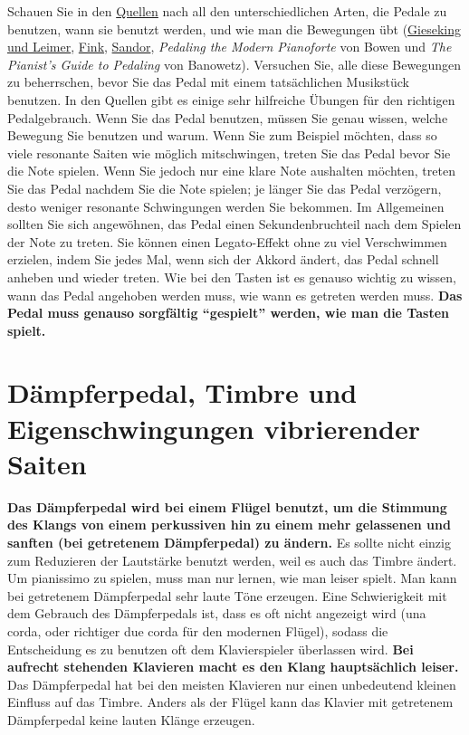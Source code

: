 Schauen Sie in den \hyperlink{reference}{Quellen} nach all den unterschiedlichen Arten, die Pedale zu benutzen, wann sie benutzt werden, und wie man die Bewegungen übt (\hyperlink{Gieseking}{Gieseking und Leimer}, \hyperlink{Fink}{Fink}, \hyperlink{Sandor}{Sandor}, \textit{Pedaling the Modern Pianoforte} von Bowen und \textit{The Pianist's Guide to Pedaling} von Banowetz).
Versuchen Sie, alle diese Bewegungen zu beherrschen, bevor Sie das Pedal mit einem tatsächlichen Musikstück benutzen.
In den Quellen gibt es einige sehr hilfreiche Übungen für den richtigen Pedalgebrauch.
Wenn Sie das Pedal benutzen, müssen Sie genau wissen, welche Bewegung Sie benutzen und warum.
Wenn Sie zum Beispiel möchten, dass so viele resonante Saiten wie möglich mitschwingen, treten Sie das Pedal bevor Sie die Note spielen.
Wenn Sie jedoch nur eine klare Note aushalten möchten, treten Sie das Pedal nachdem Sie die Note spielen; je länger Sie das Pedal verzögern, desto weniger resonante Schwingungen werden Sie bekommen.
Im Allgemeinen sollten Sie sich angewöhnen, das Pedal einen Sekundenbruchteil nach dem Spielen der Note zu treten.
Sie können einen Legato-Effekt ohne zu viel Verschwimmen erzielen, indem Sie jedes Mal, wenn sich der Akkord ändert, das Pedal schnell anheben und wieder treten.
Wie bei den Tasten ist es genauso wichtig zu wissen, wann das Pedal angehoben werden muss, wie wann es getreten werden muss.
\textbf{Das Pedal muss genauso sorgfältig \enquote{gespielt} werden, wie man die Tasten spielt.}


\section{Dämpferpedal, Timbre und Eigenschwingungen vibrierender Saiten}\hypertarget{c1ii24}{}

\textbf{Das Dämpferpedal wird bei einem Flügel benutzt, um die Stimmung des Klangs von einem perkussiven hin zu einem mehr gelassenen und sanften (bei getretenem Dämpferpedal) zu ändern.}
Es sollte nicht einzig zum Reduzieren der Lautstärke benutzt werden, weil es auch das Timbre ändert.
Um pianissimo zu spielen, muss man nur lernen, wie man leiser spielt.
Man kann bei getretenem Dämpferpedal sehr laute Töne erzeugen.
Eine Schwierigkeit mit dem Gebrauch des Dämpferpedals ist, dass es oft nicht angezeigt wird (una corda, oder richtiger due corda für den modernen Flügel), sodass die Entscheidung es zu benutzen oft dem Klavierspieler überlassen wird.
\textbf{Bei aufrecht stehenden Klavieren macht es den Klang hauptsächlich leiser.}
Das Dämpferpedal hat bei den meisten Klavieren nur einen unbedeutend kleinen Einfluss auf das Timbre.
Anders als der Flügel kann das Klavier mit getretenem Dämpferpedal keine lauten Klänge erzeugen.

